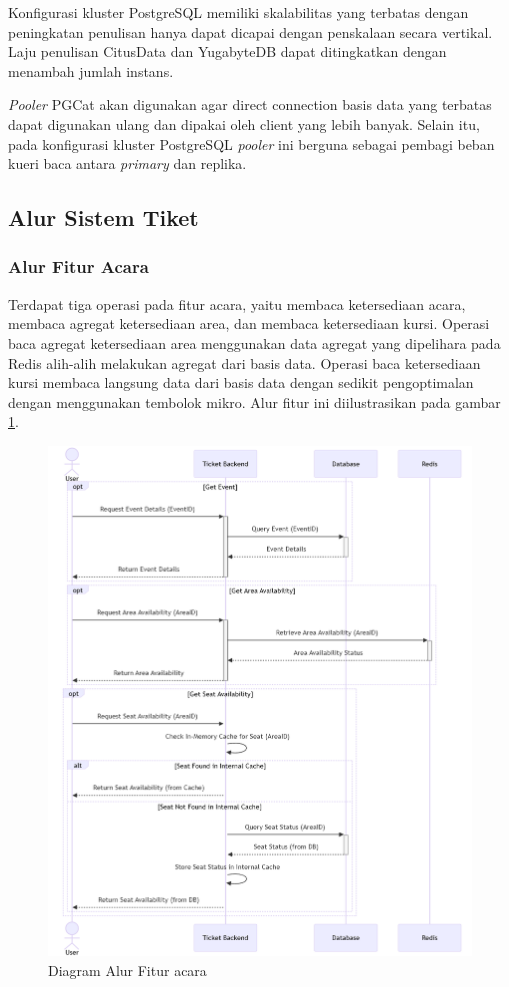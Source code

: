 Konfigurasi kluster PostgreSQL memiliki skalabilitas yang terbatas dengan peningkatan penulisan hanya dapat dicapai dengan penskalaan secara vertikal. Laju penulisan CitusData dan YugabyteDB dapat ditingkatkan dengan menambah jumlah instans.

\textit{Pooler} PGCat akan digunakan agar direct connection basis data yang terbatas dapat digunakan ulang dan dipakai oleh client yang lebih banyak. Selain itu, pada konfigurasi kluster PostgreSQL \textit{pooler} ini berguna sebagai pembagi beban kueri baca antara \textit{primary} dan replika.

\subsection{Alur Sistem Tiket}

\subsubsection{Alur Fitur Acara}

Terdapat tiga operasi pada fitur acara, yaitu membaca ketersediaan acara, membaca agregat ketersediaan area, dan membaca ketersediaan kursi. Operasi baca agregat ketersediaan area menggunakan data agregat yang dipelihara pada Redis alih-alih melakukan agregat dari basis data. Operasi baca ketersediaan kursi membaca langsung data dari basis data dengan sedikit pengoptimalan dengan menggunakan tembolok mikro. Alur fitur ini diilustrasikan pada gambar \ref{fig:flow-event}.

\begin{figure}[h]
    \centering
    \includegraphics[width=1\textwidth]{resources/chapter-3/event-flow.png}
    \caption{Diagram Alur Fitur acara}
    \label{fig:flow-event}
\end{figure}

